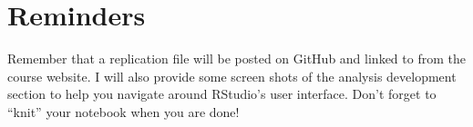 \documentclass{tufte-handout}
\begin{document}
\vspace{5mm}
\section{Reminders}
Remember that a replication file will be posted on GitHub and linked to from the course website. I will also provide some screen shots of the analysis development section to help you navigate around RStudio's user interface. Don't forget to ``knit'' your notebook when you are done!

\end{document}
